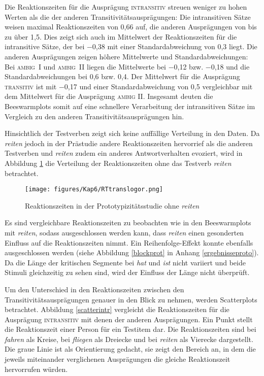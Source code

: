 Die Reaktionszeiten für die Ausprägung \textsc{intransitiv} streuen weniger zu hohen Werten als die der anderen Transitivitätsausprägungen: Die intransitiven Sätze weisen maximal Reaktionszeiten von 0,66 auf, die anderen Ausprägungen von bis zu über 1,5. Dies zeigt sich auch im Mittelwert der Reaktionszeiten für die intransitive Sätze, der bei −0,38 mit einer Standardabweichung von 0,3 liegt. Die anderen Ausprägungen zeigen höhere Mittelwerte und Standardabweichungen: Bei \textsc{ambig~I} und \textsc{ambig~II} liegen die Mittelwerte bei −0,12 bzw. −0,18 und die Standardabweichungen bei 0,6 bzw. 0,4. Der Mittelwert für die Ausprägung \textsc{transitiv} ist mit −0,17 und einer Standardabweichung von 0,5 vergleichbar mit dem Mittelwert für die Ausprägung \textsc{ambig II}. Insgesamt deuten die Beeswarmplots somit auf eine schnellere Verarbeitung der intransitiven Sätze im Vergleich zu den anderen Transitivitätsausprägungen hin. 


Hinsichtlich der Testverben zeigt sich keine auffällige Verteilung in den Daten. Da \textit{reiten} jedoch in der Prästudie andere Reaktionszeiten hervorrief als die anderen Testverben und \textit{reiten} zudem ein anderes Antwortverhalten evoziert, wird in Abbildung \ref{rtprotooR} die Verteilung der Reaktionszeiten ohne das Testverb \textit{reiten} betrachtet.  

\begin{figure}
\texttt{[image: figures/Kap6/RTtranslogor.png]} 
\caption{Reaktionszeiten in der Prototypizitätsstudie ohne \textit{reiten}}
\label{rtprotooR}
\end{figure}

Es sind vergleichbare Reaktionszeiten zu beobachten wie in den Beeswarmplots mit \textit{reiten}, sodass ausgeschlossen werden kann, dass \textit{reiten} einen gesonderten Einfluss auf die Reaktionszeiten nimmt. Ein Reihenfolge-Effekt konnte ebenfalls ausgeschlossen werden (siehe Abbildung \ref{blockprot} in Anhang \ref{ergebnisseproto}). Da die Länge der kritischen Segmente bei \textit{hat} und \textit{ist} nicht variiert und beide Stimuli gleichzeitig zu sehen sind, wird der Einfluss der Länge nicht überprüft.\largerpage

Um den Unterschied in den Reaktionszeiten zwischen den Transitivitätsausprägungen genauer in den Blick zu nehmen, werden Scatterplots betrachtet. Abbildung \ref{scatterintr} vergleicht die Reaktionszeiten für die Ausprägung \textsc{intransitiv} mit denen der anderen Ausprägungen. Ein Punkt stellt die Reaktionszeit einer Person für ein Testitem dar. Die Reaktionszeiten sind bei \textit{fahren} als Kreise, bei \textit{fliegen} als Dreiecke und bei \textit{reiten} als Vierecke dargestellt. Die graue Linie ist als Orientierung gedacht, sie zeigt den Bereich an, in dem die jeweils miteinander verglichenen Ausprägungen die gleiche Reaktionszeit hervorrufen würden.

